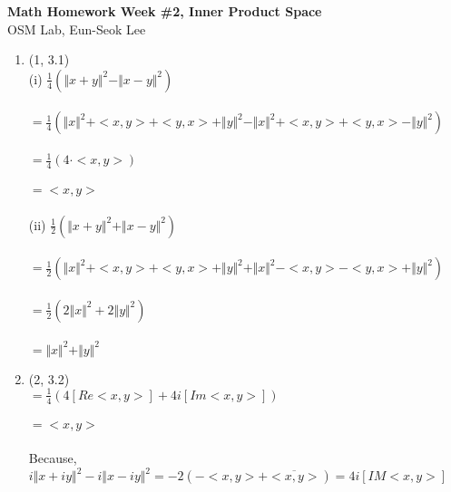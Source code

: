 \documentclass[letterpaper,12pt]{article}
\theoremstyle{definition}
\begin{document}
\begin{flushleft}
   \textbf{\large{Math Homework Week \#2, Inner Product Space}} \\[5pt]
   OSM Lab, Eun-Seok Lee \\[5pt]

\end{flushleft}

\vspace{5mm}

\begin{enumerate}

	\item (1, 3.1) \\	
(i)
$\frac{1}{4} (\Vert x + y \Vert ^2 - \Vert x - y \Vert ^2) $
\\
\\
$= \frac{1}{4} (\Vert x \Vert ^2 + <x,y> + <y,x> + \Vert y \Vert ^2 - \Vert x \Vert ^2 + <x,y> + <y,x> - \Vert y \Vert ^2) $
\\
\\
$=\frac{1}{4}(4 \cdot <x,y>)$
\\
\\
$ = <x,y>$
\\
\\
(ii)
$\frac{1}{2}(\Vert x + y \Vert ^2 + \Vert x - y \Vert ^2) $
\\
\\
$= \frac{1}{2} (\Vert x \Vert ^2 + <x,y> + <y,x> + \Vert y \Vert ^2 + \Vert x \Vert ^2 - <x,y> - <y,x> + \Vert y \Vert ^2) $
\\
\\
$=\frac{1}{2}(2 \Vert x \Vert ^2 + 2 \Vert y \Vert ^2) $
\\
\\
$=\Vert x \Vert ^2 + \Vert y \Vert ^2$





	\item (2, 3.2) \\
$=\frac{1}{4}(4[Re<x,y>] + 4i [Im <x,y>]) $
\\
\\
$=<x,y>$
\\
\\
Because, $i \Vert x + iy \Vert ^2 - i \Vert x - iy \Vert ^2 = -2(-<x,y> + \overline{<x,y>}) = 4i [IM<x,y>] $





\end{enumerate}
\end{document}

